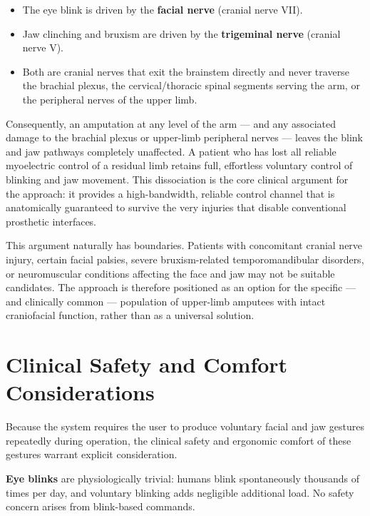 \begin{itemize}[leftmargin=*]
    \item The eye blink is driven by the \textbf{facial nerve}
    (cranial nerve VII).
    \item Jaw clinching and bruxism are driven by the
    \textbf{trigeminal nerve} (cranial nerve V).
    \item Both are cranial nerves that exit the brainstem directly
    and never traverse the brachial plexus, the cervical/thoracic
    spinal segments serving the arm, or the peripheral nerves of the
    upper limb.
\end{itemize}

Consequently, an amputation at any level of the arm --- and any
associated damage to the brachial plexus or upper-limb peripheral
nerves --- leaves the blink and jaw pathways completely unaffected.
A patient who has lost all reliable myoelectric control of a residual
limb retains full, effortless voluntary control of blinking and jaw
movement. This dissociation is the core clinical argument for the
approach: it provides a high-bandwidth, reliable control channel that
is anatomically guaranteed to survive the very injuries that disable
conventional prosthetic interfaces.

This argument naturally has boundaries. Patients with concomitant
cranial nerve injury, certain facial palsies, severe bruxism-related
temporomandibular disorders, or neuromuscular conditions affecting the
face and jaw may not be suitable candidates. The approach is therefore
positioned as an option for the specific --- and clinically common ---
population of upper-limb amputees with intact craniofacial function,
rather than as a universal solution.

\section{Clinical Safety and Comfort Considerations}
\label{sec:med_safety}

Because the system requires the user to produce voluntary facial and
jaw gestures repeatedly during operation, the clinical safety and
ergonomic comfort of these gestures warrant explicit consideration.

\textbf{Eye blinks} are physiologically trivial: humans blink
spontaneously thousands of times per day, and voluntary blinking adds
negligible additional load. No safety concern arises from blink-based
commands.

